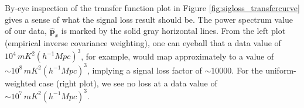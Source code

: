 \documentclass[preprint2,numberedappendix,tighten]{aastex6}  %
\newcommand{\phat}{\widehat{\mathbf{p}}}
\begin{document}

By-eye inspection of the transfer function plot in Figure \ref{fig:sigloss_transfercurve} gives a sense of what the signal loss result should be. The power spectrum value of our data, $
\widehat{\textbf{p}}_{x}$ is marked by the solid gray horizontal lines. From the left plot (empirical inverse covariance weighting), one can eyeball that a data value of $10^{4} \, mK^{2} (h^{-1} Mpc)^{3}$, for example, would map approximately to a 
value of $\sim10^{8} \, mK^{2} (h^{-1} Mpc)^{3}$, implying a signal loss factor of $\sim10000$. For the uniform-weighted case (right plot), we see no loss at a data value of $\sim10^{7} \, mK^{2} (h^{-1} Mpc)^{3}$.
\end{document}
